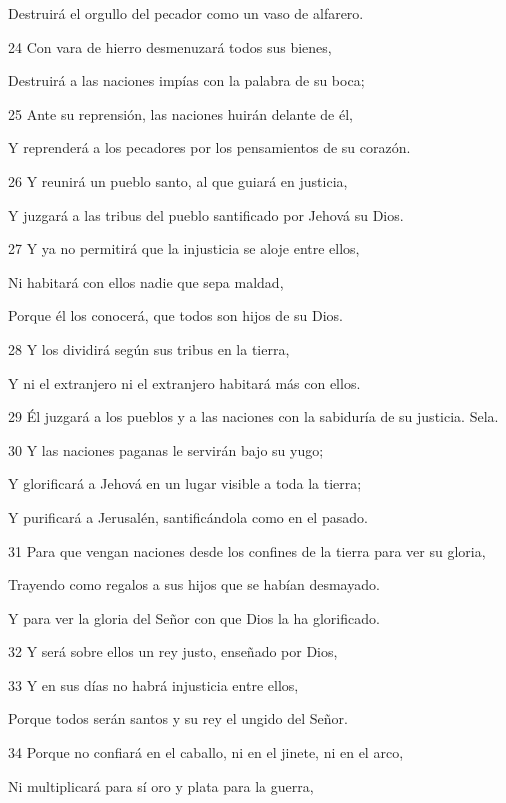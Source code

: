 \par     Destruirá el orgullo del pecador como un vaso de alfarero.
\par 24 Con vara de hierro desmenuzará todos sus bienes,
\par     Destruirá a las naciones impías con la palabra de su boca;
\par 25 Ante su reprensión, las naciones huirán delante de él,
\par     Y reprenderá a los pecadores por los pensamientos de su corazón.
\par   
\par 26 Y reunirá un pueblo santo, al que guiará en justicia,
\par     Y juzgará a las tribus del pueblo santificado por Jehová su Dios.
\par 27 Y ya no permitirá que la injusticia se aloje entre ellos,
\par     Ni habitará con ellos nadie que sepa maldad,
\par     Porque él los conocerá, que todos son hijos de su Dios.
\par 28 Y los dividirá según sus tribus en la tierra,
\par     Y ni el extranjero ni el extranjero habitará más con ellos.
\par 29 Él juzgará a los pueblos y a las naciones con la sabiduría de su justicia. Sela.
\par   
\par 30 Y las naciones paganas le servirán bajo su yugo;
\par     Y glorificará a Jehová en un lugar visible a toda la tierra;
\par     Y purificará a Jerusalén, santificándola como en el pasado.
\par 31 Para que vengan naciones desde los confines de la tierra para ver su gloria,
\par     Trayendo como regalos a sus hijos que se habían desmayado.
\par     Y para ver la gloria del Señor con que Dios la ha glorificado.
\par 32 Y será sobre ellos un rey justo, enseñado por Dios,
\par 33 Y en sus días no habrá injusticia entre ellos,
\par     Porque todos serán santos y su rey el ungido del Señor.
\par 34 Porque no confiará en el caballo, ni en el jinete, ni en el arco,
\par     Ni multiplicará para sí oro y plata para la guerra,
